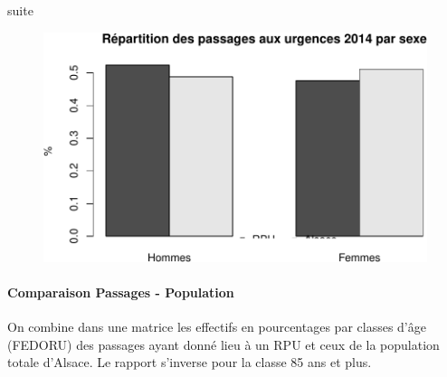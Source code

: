 \documentclass[]{article}
\newenvironment{Shaded}{\begin{snugshade}}{\end{snugshade}}
\newcommand{\KeywordTok}[1]{\textcolor[rgb]{0.13,0.29,0.53}{\textbf{{#1}}}}
\newcommand{\DataTypeTok}[1]{\textcolor[rgb]{0.13,0.29,0.53}{{#1}}}
\newcommand{\DecValTok}[1]{\textcolor[rgb]{0.00,0.00,0.81}{{#1}}}
\newcommand{\FloatTok}[1]{\textcolor[rgb]{0.00,0.00,0.81}{{#1}}}
\newcommand{\StringTok}[1]{\textcolor[rgb]{0.31,0.60,0.02}{{#1}}}
\newcommand{\OtherTok}[1]{\textcolor[rgb]{0.56,0.35,0.01}{{#1}}}
\newcommand{\NormalTok}[1]{{#1}}
\begin{document}
suite

\begin{Shaded}
\end{Shaded}

\begin{figure}[htbp]
\centering
\includegraphics{./age_files/figure-latex/unnamed-chunk-2-1.pdf}
\end{figure}

\paragraph{Comparaison Passages -
Population}\label{comparaison-passages---population}

On combine dans une matrice les effectifs en pourcentages par classes
d'âge (FEDORU) des passages ayant donné lieu à un RPU et ceux de la
population totale d'Alsace. Le rapport s'inverse pour la classe 85 ans
et plus.
\end{document}
